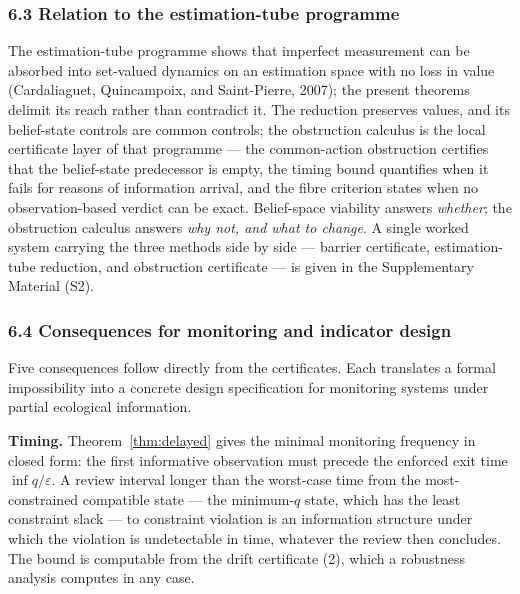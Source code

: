 \documentclass[10pt,twocolumn]{article}
\theoremstyle{definition}
\begin{document}
\subsubsection{6.3 Relation to the estimation-tube
programme}\label{relation-to-the-estimation-tube-programme}

The estimation-tube programme shows that imperfect measurement can be absorbed into set-valued dynamics on an estimation space with no loss in value (Cardaliaguet, Quincampoix, and Saint-Pierre, 2007); the present theorems delimit its reach rather than contradict it. The reduction preserves values, and its belief-state controls are common controls; the obstruction calculus is the local certificate layer of that programme --- the common-action obstruction certifies that the belief-state predecessor is empty, the timing bound quantifies when it fails for reasons of information arrival, and the fibre criterion states when no observation-based verdict can be exact. Belief-space viability answers \emph{whether}; the obstruction calculus answers \emph{why not, and what to change}. A single worked system carrying the three methods side by side --- barrier certificate, estimation-tube reduction, and obstruction certificate --- is given in the Supplementary Material (S2).

\subsubsection{6.4 Consequences for monitoring and indicator
design}\label{consequences-for-monitoring-and-indicator-design}



Five consequences follow directly from the certificates. Each translates
a formal impossibility into a concrete design specification for
monitoring systems under partial ecological information.

\textbf{Timing.} Theorem~\ref{thm:delayed} gives the minimal monitoring frequency in
closed form: the first informative observation must precede the enforced
exit time \(\inf q / \varepsilon\). A review interval longer than the
worst-case time from the most-constrained compatible state --- the
minimum-\(q\) state, which has the least constraint slack --- to
constraint violation is an information structure under which the
violation is undetectable in time, whatever the review then concludes.
The bound is computable from the drift certificate (2), which a robustness analysis computes in any case.
\end{document}
